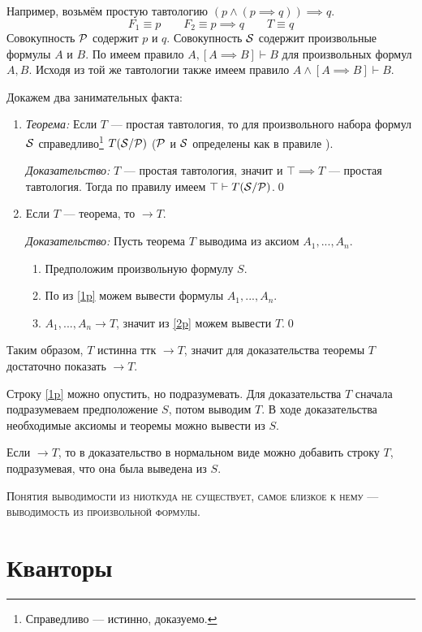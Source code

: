Например, возьмём простую тавтологию $(p\land (p\implies q))\implies q$.
\[
	F_1\equiv p\qquad F_2\equiv p\implies q\qquad T\equiv q
\]
Совокупность $\mathcal P$ содержит $p$ и $q$.
Совокупность $\mathcal S$ содержит произвольные формулы $A$ и $B$.
По \taut{} имеем правило ${A,[A\implies B]\vdash B}$
для произвольных формул $A,B$.
Исходя из той же тавтологии также имеем правило ${A\land[A\implies B]\vdash B}$.

Докажем два занимательных факта:
\begin{enumerate}
	\item{}
	      {\it Теорема:}
	Если $T$ --- простая тавтология, то
	для произвольного набора формул $\mathcal S$ справедливо\footnote{
		Справедливо --- истинно, доказуемо.
	} $T(\mathcal S/\mathcal P)$
	($\mathcal P$ и $\mathcal S$ определены как в правиле \taut{}).

		{\it Доказательство:}
	$T$ --- простая тавтология, значит и
	${\top\implies T}$ --- простая тавтология. Тогда по правилу \taut{} имеем
	$\top\vdash T(\mathcal S/\mathcal P)$.\qed

	\item{}Если $T$ --- теорема, то $\to T$.

		{\it Доказательство:}
	Пусть теорема $T$ выводима из аксиом $A_1,...,A_{n}$.
	\begin{enumerate}[label=(\roman*)]
		\item{}\label{1p}Предположим произвольную формулу $S$.
		\item{}\label{2p}По \axiom{} из \ref{1p} можем вывести
		формулы $A_1,...,A_{n}$.
		\item{}\label{3p}$A_1,...,A_{n}\to T$, значит из \ref{2p} можем вывести $T$.\qed
	\end{enumerate}
\end{enumerate}

Таким образом, $T$ истинна ттк $\to T$, значит для доказательства теоремы $T$
достаточно показать $\to T$.

Строку \ref{1p} можно опустить, но подразумевать.
Для доказательства $T$ сначала подразумеваем предположение $S$, потом
выводим $T$. В ходе доказательства необходимые
аксиомы и теоремы можно вывести из $S$.

Если $\to T$, то в доказательство в нормальном виде
можно добавить строку $T$, подразумевая, что она была выведена из $S$.

\textsc{Понятия выводимости из ниоткуда не существует,
	самое близкое к нему --- выводимость из произвольной формулы.}

\section{Кванторы}

